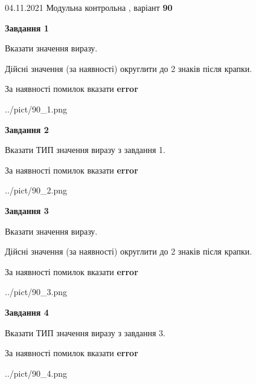 \documentclass[11pt, ukrainian]{article}
\begin{document}
{04.11.2021 Модульна контрольна , варіант  \No \textbf { 90 }\par}
{
\begin {large}
{\begin {center}\textbf{Завдання 1}\end {center}}\par
Вказати значення виразу. \par
Дійсні значення (за наявності) округлити до 2 знаків після крапки. \par
За наявності помилок вказати \textbf{error}

\begin{center}
	{../pict/90_1.png}
\end{center}
\newpage

{\begin {center}\textbf{Завдання 2}\end {center}}\par
Вказати ТИП значення виразу з завдання 1. \par
За наявності помилок вказати \textbf{error}

\begin{center}
	{../pict/90_2.png}
\end{center}
\newpage

{\begin {center}\textbf{Завдання 3}\end {center}}\par
Вказати значення виразу. \par
Дійсні значення (за наявності) округлити до 2 знаків після крапки. \par
За наявності помилок вказати \textbf{error}

\begin{center}
	{../pict/90_3.png}
\end{center}
\newpage

{\begin {center}\textbf{Завдання 4}\end {center}}\par
Вказати ТИП значення виразу з завдання 3. \par
За наявності помилок вказати \textbf{error}

\begin{center}
	{../pict/90_4.png}
\end{center}
\newpage


\end{large}}
\end{document}
